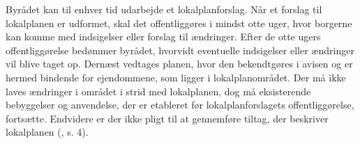 \newline
Byrådet kan til enhver tid udarbejde et lokalplanforslag. Når et forslag til lokalplanen er udformet, skal det offentliggøres i mindst otte uger, hvor borgerne kan komme med indsigelser eller forslag til ændringer. Efter de otte ugers offentliggørelse bedømmer byrådet, hvorvidt eventuelle indsigelser eller ændringer vil blive taget op. Dernæst vedtages planen, hvor den bekendtgøres i avisen og er hermed bindende for ejendommene, som ligger i lokalplanområdet.
\newline \indent{     }  Der må ikke laves ændringer i området i strid med lokalplanen, dog må eksisterende bebyggelser og anvendelse, der er etableret før lokalplanforslagets offentliggørelse, fortsætte. Endvidere er der ikke pligt til at gennemføre tiltag, der beskriver lokalplanen (\citep{lokalplan}, s. 4).

